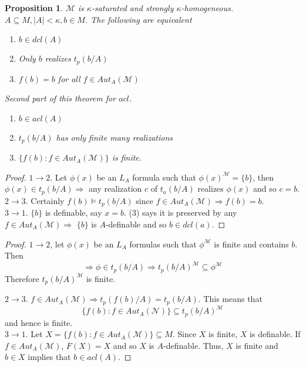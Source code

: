 \documentclass[letterpaper, 12pt]{article}
\newcommand{\cM}{\mathcal{M}}
\newcommand{\cN}{\mathcal{N}}
\theoremstyle{stdthm}
\newtheorem{prop}[thm]{Proposition}
\theoremstyle{stddef}
\theoremstyle{stdnonum}
\theoremstyle{stdqands}
\theoremstyle{stdbold}
\begin{document}
\begin{prop}
\label{prop42} $\cM$ is $\kappa$-saturated and strongly $\kappa$-homogeneous.  $A \subseteq M, |A| < \kappa, b \in M$. The following are equivalent
\begin{enumerate}
\item $b \in dcl(A)$
\item Only $b$ realizes $t_p(b/A)$
\item $f(b) = b$ for all $f \in Aut_A(\cM)$ 
\end{enumerate}

Second part of this theorem for $acl$. 
\begin{enumerate}
\item $b \in acl(A)$
\item $t_p(b/A)$ has only finite many realizations
\item $\{f(b): f \in Aut_A(\cM)\}$ is finite. 
\end{enumerate}


\end{prop}

\begin{proof}
$1\to 2$. Let $\phi(x)$ be an $L_A$ formula such that $\phi(x)^\cM = \{b\}$, then $\phi(x) \in t_p(b/A) \Rightarrow$ any realization $c$ of $t_a(b/A)$ realizes $\phi(x)$ and so $c = b$. \\

$2 \to 3$. Certainly $f(b) \models t_p(b/A)$ since $f \in Aut_A(\cM) \Rightarrow f(b) = b$.\\

$3 \to 1$. $\{b\}$ is definable, say $x =b$. (3) says it is preserved by any $f \in Aut_A(\cM)\Rightarrow $ $\{b\}$ is $A$-definable and so $b \in dcl(a)$.    
\end{proof}

\begin{proof}
$1\to 2$, let $\phi(x)$ be an $L_A$ formulas such that $\phi^\cM$ is finite and contains $b$. Then 
\[ \Rightarrow \phi \in t_p(b/A) \Rightarrow t_p(b/A)^\cM \subseteq \phi^\cM \]
Therefore $t_p(b/A)^\cM$ is finite. 

$2\to 3$. $f \in Aut_A(\cM)\Rightarrow t_p(f(b)/A) = t_p(b/A)$. This means that 
\[ \{f(b): f \in Aut_A(\cN)\} \subseteq t_p(b/A)^\cM \]
and hence is finite.\\

$3 \to 1$. Let $X = \{f(b): f \in Aut_A(\cM)\} \subseteq M$. Since $X$ is finite, $X$ is definable. If $f \in Aut_A(\cM)$, $F(X) = X$ and so $X$ is $A$-definable. Thus, $X$ is finite and $b \in X$ implies that $b \in acl(A)$.  
\end{proof}
\end{document}
